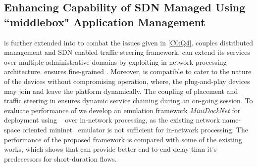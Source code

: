 \subsection{Enhancing Capability of SDN Managed  Using ``middlebox" Application Management}
 is further extended into  to combat the issues given in \cref{C0:Q4}.  couples distributed  management and SDN enabled traffic steering framework.  can extend its services over multiple administrative domains by exploiting in-network processing~\cite{10.1007/978-3-030-19759-9_6,225992} architecture.  ensures fine-grained . Moreover,  is compatible to cater to the  nature of the devices without compromising operation, where, the plug-and-play devices may join and leave the platform dynamically. The coupling of  placement and traffic steering in  ensures dynamic service chaining during an on-going session. To evaluate performance of  we develop an emulation framework \emph{MiniDockNet} for  deployment using ~\cite{docker} over in-network processing, as the existing network name-space oriented mininet~\cite{Lantz:2010:NLR:1868447.1868466} emulator is not sufficient for in-network processing. The performance of the proposed framework is compared with some of the existing works, which shows that  can provide better end-to-end delay than it's predecessors for short-duration flows.

